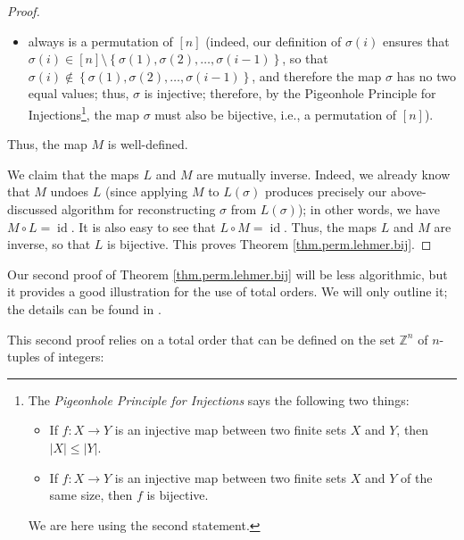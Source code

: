 \begin{proof}
\begin{itemize}
\item always is a permutation of $\left[  n\right]  $ (indeed, our definition
of $\sigma\left(  i\right)  $ ensures that $\sigma\left(  i\right)  \in\left[
n\right]  \setminus\left\{  \sigma\left(  1\right)  ,\sigma\left(  2\right)
,\ldots,\sigma\left(  i-1\right)  \right\}  $, so that $\sigma\left(
i\right)  \notin\left\{  \sigma\left(  1\right)  ,\sigma\left(  2\right)
,\ldots,\sigma\left(  i-1\right)  \right\}  $, and therefore the map $\sigma$
has no two equal values; thus, $\sigma$ is injective; therefore, by the
Pigeonhole Principle for Injections\footnote{The \emph{Pigeonhole Principle
for Injections} says the following two things:
\par
\begin{itemize}
\item If $f:X\rightarrow Y$ is an injective map between two finite sets $X$
and $Y$, then $\left\vert X\right\vert \leq\left\vert Y\right\vert $.
\par
\item If $f:X\rightarrow Y$ is an injective map between two finite sets $X$
and $Y$ of the same size, then $f$ is bijective.
\end{itemize}
\par
We are here using the second statement.}, the map $\sigma$ must also be
bijective, i.e., a permutation of $\left[  n\right]  $).
\end{itemize}

\noindent Thus, the map $M$ is well-defined.

We claim that the maps $L$ and $M$ are mutually inverse. Indeed, we already
know that $M$ undoes $L$ (since applying $M$ to $L\left(  \sigma\right)  $
produces precisely our above-discussed algorithm for reconstructing $\sigma$
from $L\left(  \sigma\right)  $); in other words, we have $M\circ
L=\operatorname*{id}$. It is also easy to see that $L\circ
M=\operatorname*{id}$. Thus, the maps $L$ and $M$ are inverse, so that $L$ is
bijective. This proves Theorem \ref{thm.perm.lehmer.bij}.
\end{proof}

Our second proof of Theorem \ref{thm.perm.lehmer.bij} will be less
algorithmic, but it provides a good illustration for the use of total orders.
We will only outline it; the details can be found in \cite[solution to
Exercise 5.18]{detnotes}.

This second proof relies on a total order that can be defined on the set
$\mathbb{Z}^{n}$ of $n$-tuples of integers:

